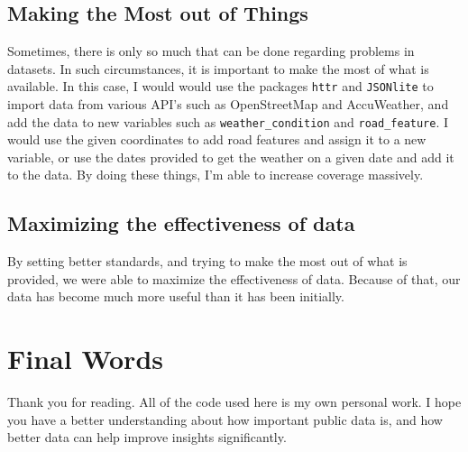 \documentclass[
]{book}
\begin{document}
\hypertarget{making-the-most-out-of-things}{%
\section{Making the Most out of Things}\label{making-the-most-out-of-things}}

Sometimes, there is only so much that can be done regarding problems in datasets. In such circumstances, it is important to make the most of what is available. In this case, I would would use the packages \texttt{httr} and \texttt{JSONlite} to import data from various API's such as OpenStreetMap and AccuWeather, and add the data to new variables such as \texttt{weather\_condition} and \texttt{road\_feature}. I would use the given coordinates to add road features and assign it to a new variable, or use the dates provided to get the weather on a given date and add it to the data. By doing these things, I'm able to increase coverage massively.

\hypertarget{maximizing-the-effectiveness-of-data}{%
\section{Maximizing the effectiveness of data}\label{maximizing-the-effectiveness-of-data}}

By setting better standards, and trying to make the most out of what is provided, we were able to maximize the effectiveness of data. Because of that, our data has become much more useful than it has been initially.

\hypertarget{final-words}{%
\chapter{Final Words}\label{final-words}}

Thank you for reading. All of the code used here is my own personal work. I hope you have a better understanding about how important public data is, and how better data can help improve insights significantly.

  
\end{document}
